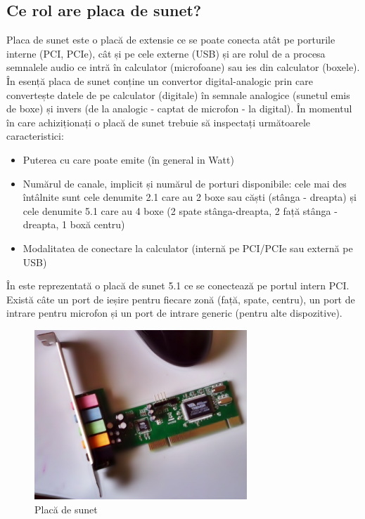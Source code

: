 \subsection{Ce rol are placa de sunet?}
\label{sec:hardware-extensii-audio}

Placa de sunet este o placă de extensie ce se poate conecta atât pe porturile
interne (PCI, PCIe), cât și pe cele externe (USB) și are rolul de a procesa
semnalele audio ce intră în calculator (microfoane) sau ies din calculator
(boxele). În esență placa de sunet conține un convertor digital-analogic prin
care convertește datele de pe calculator (digitale) în semnale analogice
(sunetul emis de boxe) și invers (de la analogic - captat de microfon - la
digital). În momentul în care achiziționați o placă de sunet trebuie să
inspectați următoarele caracteristici:

\begin{itemize}
	\item Puterea cu care poate emite (în general in Watt)
	\item Numărul de canale, implicit și numărul de porturi disponibile:
		cele mai des întâlnite sunt cele denumite 2.1 care au 2 boxe sau
		căști (stânga - dreapta) și cele denumite 5.1 care au 4 boxe (2
		spate stânga-dreapta, 2 față stânga -dreapta, 1 boxă centru)
	\item Modalitatea de conectare la calculator (internă pe PCI/PCIe sau
		externă pe USB)
\end{itemize}

În  este reprezentată o placă de sunet 5.1
ce se conectează pe portul intern PCI. Există câte un port de ieșire pentru
fiecare zonă (față, spate, centru), un port de intrare pentru microfon și un
port de intrare generic (pentru alte dispozitive).

\begin{figure}[!htbp]
	\centering
	\includegraphics[width=8cm]{chapters/08-hw/img/audio-img.png}
	\caption{Placă de sunet\protect\footnotemark}
	\label{fig:hw-audio}
\end{figure}

